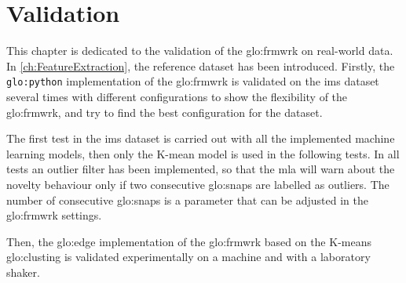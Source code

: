 \chapter{Validation}
\label{sec:Validation}

This chapter is dedicated to the validation of the \gls{glo:frmwrk} on real-world data. In \autoref{ch:FeatureExtraction}, the reference dataset \cite{lee2007bearingdataset} has been introduced. Firstly, the \texttt{\gls{glo:python}} implementation of the \gls{glo:frmwrk} is validated on the \gls{ims} dataset several times with different configurations to show the flexibility of the \gls{glo:frmwrk}, and try to find the best configuration for the dataset. 

The first test in the \gls{ims} dataset is carried out with all the implemented machine learning models, then only the K-mean model is used in the following tests. In all tests an outlier filter has been implemented, so that the \gls{mla} will warn about the novelty behaviour only if two consecutive \gls{glo:snap}s are labelled as outliers. The number of consecutive \gls{glo:snap}s is a parameter that can be adjusted in the \gls{glo:frmwrk} settings.

Then, the \gls{glo:edge} implementation of the \gls{glo:frmwrk} based on the K-means \gls{glo:clust}ing is validated experimentally on a machine and with a laboratory shaker.









